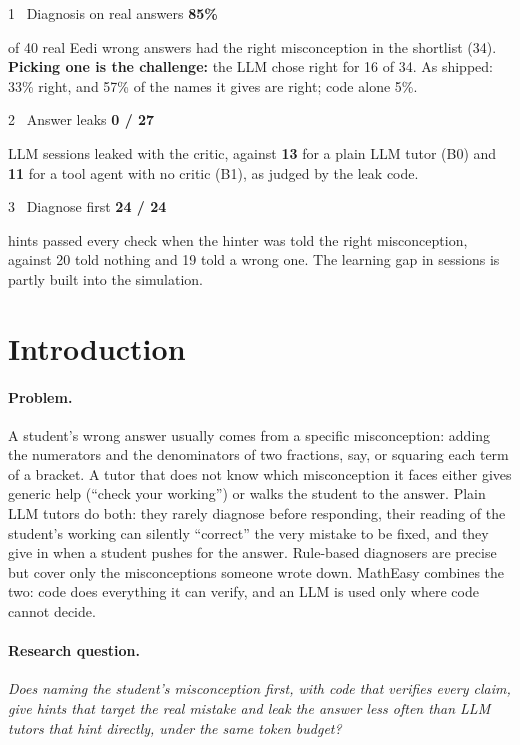 \documentclass[11pt,a4paper]{article}
\newcommand{\bignum}[1]{{\sffamily\bfseries\fontsize{20}{22}\selectfont\color{primary}#1}\par\smallskip}
\begin{document}
\begin{tcbraster}[raster columns=3, raster equal height, raster column skip=6pt]
\begin{keyresult}{1 \textperiodcentered\ Diagnosis on real answers}
\bignum{85\%}
of 40 real Eedi wrong answers had the right misconception in the shortlist (34). \textbf{Picking one is the challenge:} the LLM chose right for 16 of 34. As shipped: 33\% right, and 57\% of the names it gives are right; code alone 5\%.
\end{keyresult}
\begin{keyresult}{2 \textperiodcentered\ Answer leaks}
\bignum{0 / 27}
LLM sessions leaked with the critic, against \textbf{13} for a plain LLM tutor (B0) and \textbf{11} for a tool agent with no critic (B1), as judged by the leak code.
\end{keyresult}
\begin{keyresult}{3 \textperiodcentered\ Diagnose first}
\bignum{24 / 24}
hints passed every check when the hinter was told the right misconception, against 20 told nothing and 19 told a wrong one. The learning gap in sessions is partly built into the simulation.
\end{keyresult}
\end{tcbraster}


\section{Introduction}

\paragraph{Problem.} A student's wrong answer usually comes from a specific misconception: adding the numerators and the denominators of two fractions, say, or squaring each term of a bracket. A tutor that does not know which misconception it faces either gives generic help (``check your working'') or walks the student to the answer. Plain LLM tutors do both: they rarely diagnose before responding, their reading of the student's working can silently ``correct'' the very mistake to be fixed, and they give in when a student pushes for the answer. Rule-based diagnosers are precise but cover only the misconceptions someone wrote down. MathEasy combines the two: code does everything it can verify, and an LLM is used only where code cannot decide.

\paragraph{Research question.} \emph{Does naming the student's misconception first, with code that verifies every claim, give hints that target the real mistake and leak the answer less often than LLM tutors that hint directly, under the same token budget?}
\end{document}
